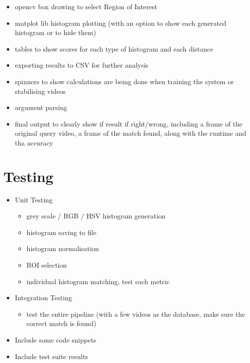 \begin{itemize}
    \item opencv box drawing to select Region of Interest
    \item matplot lib histogram plotting (with an option to show each generated histogram or to hide them)
    \item tables to show scores for each type of histogram and each distance
    \item exporting results to CSV for further analysis
    \item spinners to show calculations are being done when training the system or stabilising videos 
    \item argument parsing
    \item final output to clearly show if result if right/wrong, including a frame of the original query video, a frame of the match found, along with the runtime and tha accuracy
\end{itemize}

\section{Testing}

\begin{itemize}
    \item Unit Testing
        \begin{itemize}
            \item grey scale / RGB / HSV histogram generation
            \item histogram saving to file
            \item histogram normalisation
            \item ROI selection
            \item individual histogram matching, test each metric
        \end{itemize}
    \item Integration Testing
        \begin{itemize}
            \item test the entire pipeline (with a few videos as the database, make sure the correct match is found)
        \end{itemize}
    \item Include some code snippets
    \item Include test suite results
\end{itemize}